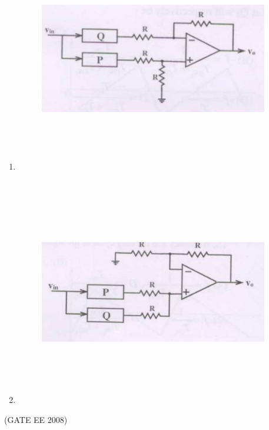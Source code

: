 \documentclass[journal,12pt,onecolumn]{IEEEtran}
\theoremstyle{remark}
\begin{document}
\begin{enumerate}[start=1, label=Q.\arabic*]
\begin{enumerate}[label=(\Alph*)]
\begin{figure}[H]
    \label{fig:placeholder}
\end{figure}
\item \begin{figure}[H]
    \centering
    \includegraphics[width=10cm, height=10cm]{Fig/q41-C.png}
    \label{fig:placeholder}
\end{figure}
\item 
\begin{figure}[H]
    \centering
    \includegraphics[width=10cm, height=10cm]{Fig/q41-D.png}
    \label{fig:placeholder}
\end{figure}

\end{enumerate}
\hfill (GATE EE 2008)


\end{enumerate}
\end{document}
